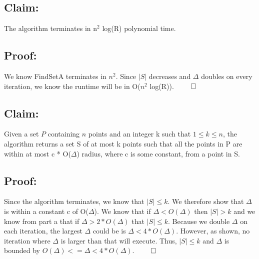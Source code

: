 \documentclass[11pt]{article}
\begin{document}
\subsection*{Claim:}

The algorithm terminates in n$^2$ log(R) polynomial time.

\subsection*{Proof:}

We know FindSetA terminates in $n^2$. Since $|S|$ decreases and $\Delta$ doubles on every iteration, we know the runtime will be in O($n^2$ log(R)). $\qed$

\subsection*{Claim:}

Given a set $P$ containing $n$ points and an integer k such that $1 \leq k \leq n$, the algorithm returns a set S of at most k points such that all the points in P are within at most c * O($\Delta$) radius, where c is some constant, from a point in S. 

\subsection*{Proof:}

Since the algorithm terminates, we know that $|S| \leq k$. We therefore show that $\Delta$ is within a constant c of O($\Delta$). We know that if $\Delta < O(\Delta)$ then $|S| > k$ and we know from part a that if $\Delta > 2 * O(\Delta)$ that $|S| \leq k$. Because we double $\Delta$ on each iteration, the largest $\Delta$ could be is $\Delta < 4 * O(\Delta)$. However, as shown, no iteration where $\Delta$ is larger than that will execute. Thus, $|S| \leq k$ and $\Delta$ is bounded by $O(\Delta) <= \Delta < 4 * O(\Delta)$. $\qed$
\end{document}

